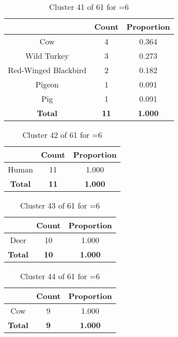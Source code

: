 \begin{table}[ht!]
\centering
\begin{tabular}{|c|c|c|}
\hline
\bf \Spec{} &\bf Count &\bf Proportion\\ \hline \hline
Cow & 4 & 0.364\\ \hline
Wild Turkey & 3 & 0.273\\ \hline
Red-Winged Blackbird & 2 & 0.182\\ \hline
Pigeon & 1 & 0.091\\ \hline
Pig & 1 & 0.091\\ \hline
\hline
\bf Total & \bf 11 & \bf 1.000\\ \hline
\end{tabular}
\label{tab:cluster:41:6}
\caption{Cluster 41 of 61 for \minneigh{}=6}
\end{table}

\begin{table}[ht!]
\centering
\begin{tabular}{|c|c|c|}
\hline
\bf \Spec{} &\bf Count &\bf Proportion\\ \hline \hline
Human & 11 & 1.000\\ \hline
\hline
\bf Total & \bf 11 & \bf 1.000\\ \hline
\end{tabular}
\label{tab:cluster:42:6}
\caption{Cluster 42 of 61 for \minneigh{}=6}
\end{table}

\begin{table}[ht!]
\centering
\begin{tabular}{|c|c|c|}
\hline
\bf \Spec{} &\bf Count &\bf Proportion\\ \hline \hline
Deer & 10 & 1.000\\ \hline
\hline
\bf Total & \bf 10 & \bf 1.000\\ \hline
\end{tabular}
\label{tab:cluster:43:6}
\caption{Cluster 43 of 61 for \minneigh{}=6}
\end{table}

\begin{table}[ht!]
\centering
\begin{tabular}{|c|c|c|}
\hline
\bf \Spec{} &\bf Count &\bf Proportion\\ \hline \hline
Cow & 9 & 1.000\\ \hline
\hline
\bf Total & \bf 9 & \bf 1.000\\ \hline
\end{tabular}
\label{tab:cluster:44:6}
\caption{Cluster 44 of 61 for \minneigh{}=6}
\end{table}

